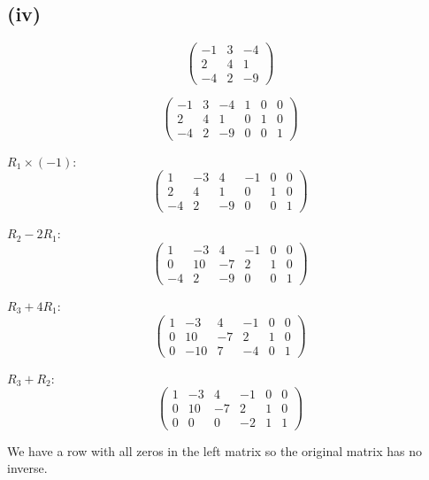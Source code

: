 \subsection*{(iv)}
\[
	\begin{pmatrix}
		-1 & 3 & -4 \\
		2  & 4 & 1  \\
		-4 & 2 & -9
	\end{pmatrix}
\]

\[
	\begin{pmatrix}
		-1 & 3 & -4 & 1 & 0 & 0 \\
		2  & 4 & 1  & 0 & 1 & 0 \\
		-4 & 2 & -9 & 0 & 0 & 1
	\end{pmatrix}
\]

$R_1 \times (-1)$:
\[
	\begin{pmatrix}
		1 & -3 & 4  & -1 & 0 & 0 \\
		2 & 4  & 1  & 0  & 1 & 0 \\
		-4 & 2  & -9 & 0  & 0 & 1
	\end{pmatrix}
\]

$R_2 - 2R_1$:
\[
	\begin{pmatrix}
		1 & -3 & 4  & -1 & 0 & 0 \\
		0 & 10 & -7 & 2  & 1 & 0 \\
		-4 & 2  & -9 & 0  & 0 & 1
	\end{pmatrix}
\]

$R_3 + 4R_1$:
\[
	\begin{pmatrix}
		1 & -3  & 4   & -1 & 0 & 0 \\
		0 & 10  & -7  & 2  & 1 & 0 \\
		0 & -10 & 7   & -4 & 0 & 1
	\end{pmatrix}
\]

$R_3 + R_2$:
\[
	\begin{pmatrix}
		1 & -3 & 4  & -1 & 0 & 0 \\
		0 & 10 & -7 & 2  & 1 & 0 \\
		0 & 0  & 0  & -2 & 1 & 1
	\end{pmatrix}
\]

We have a row with all zeros in the left matrix so the original matrix has no inverse.